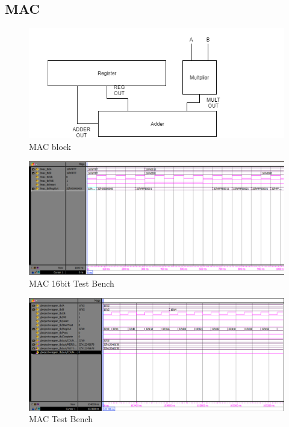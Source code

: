 \documentclass[11pt]{article}
\begin{document}
	\subsection{MAC}
	
		\begin{figure}[H] 
			\centering 
			\includegraphics[width=\textwidth,height=\dimexpr\textheight-4\baselineskip-\abovecaptionskip-\belowcaptionskip\relax,keepaspectratio]{"Pictures/MAC-block"}
			\caption{MAC block} 
			\label{fig:MAC-block} 
		\end{figure}
		
		\begin{figure}[H] 
			\centering 
			\includegraphics[width=\textwidth,height=\dimexpr\textheight-4\baselineskip-\abovecaptionskip-\belowcaptionskip\relax,keepaspectratio]{"Pictures/MAC-16bit-Test-Bench"}
			\caption{MAC 16bit Test Bench} 
			\label{fig:MAC-16bit-Test-Bench} 
		\end{figure}
		
		
		\begin{figure}[H] 
			\centering 
			\includegraphics[width=\textwidth,height=\dimexpr\textheight-4\baselineskip-\abovecaptionskip-\belowcaptionskip\relax,keepaspectratio]{"Pictures/MAC-Test-Bench"}
			\caption{MAC Test Bench} 
			\label{fig:MAC-Test-Bench} 
		\end{figure}
	
\end{document}
